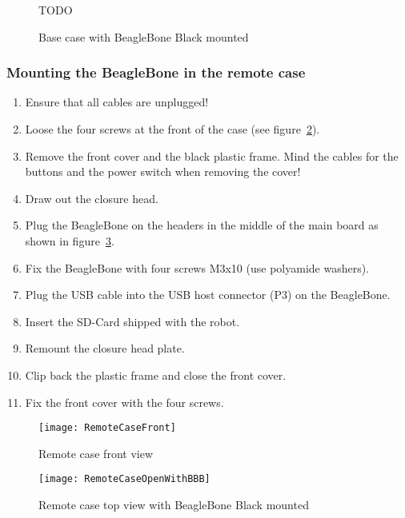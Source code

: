 \begin{figure}[htbp]
	\centering
	TODO
	\caption{Base case with BeagleBone Black mounted}
	\label{fig:BaseCaseOpenWithBBB}
\end{figure}

\subsubsection{Mounting the BeagleBone in the remote case}
\begin{enumerate}
	\item Ensure that all cables are unplugged!
	\item Loose the four screws at the front of the case (see figure~\ref{fig:RemoteCaseFront}).
	\item Remove the front cover and the black plastic frame. Mind the cables for the buttons and the power switch when removing the cover!
	\item Draw out the closure head.
	\item Plug the BeagleBone on the headers in the middle of the main board as shown in figure~\ref{fig:RemoteCaseOpenWithBBB}.
	\item Fix the BeagleBone with four screws M3x10 (use polyamide washers).
	\item Plug the USB cable into the USB host connector (P3) on the BeagleBone.
	\item Insert the SD-Card shipped with the robot.
	\item Remount the closure head plate.
	\item Clip back the plastic frame and close the front cover.
	\item Fix the front cover with the four screws.
\end{enumerate}

\begin{figure}[htbp]
	\centering
	\texttt{[image: RemoteCaseFront]}
	\caption{Remote case front view}
	\label{fig:RemoteCaseFront}
\end{figure}

\begin{figure}[htbp]
	\centering
	\texttt{[image: RemoteCaseOpenWithBBB]}
	\caption{Remote case top view with BeagleBone Black mounted}
	\label{fig:RemoteCaseOpenWithBBB}
\end{figure}

